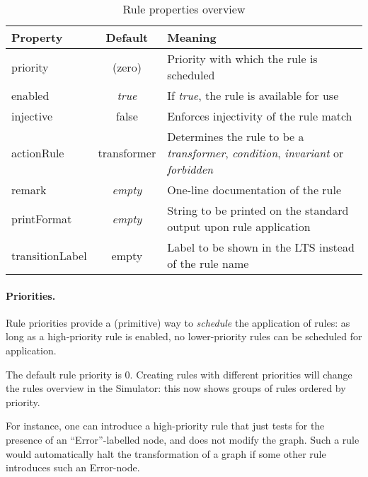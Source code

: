 \begin{table}
\begin{center}
\begin{tabular}{@{}|l|c|l|@{}}
\hline\hline
\bf Property & \bf Default & \bf Meaning \\
\hline
\sf priority
  & \sf 0 (zero)
  & Priority with which the rule is scheduled \\
\sf enabled
  & \it true
  & If \textit{true}, the rule is available for use \\
\sf injective 
  & \sf false
  & Enforces injectivity of the rule match \\
\sf actionRule 
  & \sf transformer
  & Determines the rule to be a \emph{transformer}, \emph{condition}, \emph{invariant} or \emph{forbidden} \\
\sf remark
  & \it empty
  & One-line documentation of the rule \\
\sf printFormat
  & \it empty
  & String to be printed on the standard output upon rule application \\
\sf transitionLabel
  & \sf empty
  & Label to be shown in the LTS instead of the rule name \\
\hline\hline
\end{tabular}
\end{center}
\caption{Rule properties overview}
\vspace*{-\bigskipamount}
\vspace*{-\medskipamount}
\end{table}

\paragraph{Priorities.}

Rule priorities provide a (primitive) way to
\emph{schedule} the application of rules: as long as a high-priority rule is
enabled, no lower-priority rules can be scheduled for application.

The default rule priority is 0. Creating rules with different priorities will
change the rules overview in the Simulator: this now shows groups of rules
ordered by priority.

For instance, one can introduce a high-priority rule that just tests for the
presence of an ``\textsf{Error}''-labelled node, and does not modify the
graph. Such a rule would automatically halt the transformation of a graph if
some other rule introduces such an \textsf{Error}-node.

